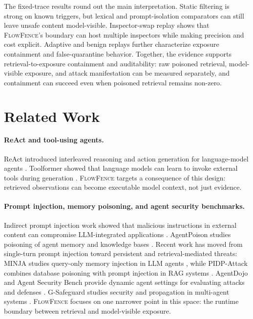 \documentclass[11pt]{article}
\newcommand{\ff}{\textsc{FlowFence}\xspace}
\begin{document}
The fixed-trace results round out the main interpretation. Static filtering is strong on known triggers, but lexical and prompt-isolation comparators can still leave unsafe content model-visible. Inspector-swap replay shows that \ff's boundary can host multiple inspectors while making precision and cost explicit. Adaptive and benign replays further characterize exposure containment and false-quarantine behavior. Together, the evidence supports retrieval-to-exposure containment and auditability: raw poisoned retrieval, model-visible exposure, and attack manifestation can be measured separately, and containment can succeed even when poisoned retrieval remains non-zero.

\section{Related Work}

\paragraph{ReAct and tool-using agents.}
ReAct introduced interleaved reasoning and action generation for language-model agents \citep{react}. Toolformer showed that language models can learn to invoke external tools during generation \citep{toolformer}. \ff targets a consequence of this design: retrieved observations can become executable model context, not just evidence.

\paragraph{Prompt injection, memory poisoning, and agent security benchmarks.}
Indirect prompt injection work showed that malicious instructions in external content can compromise LLM-integrated applications \citep{greshake2023indirect}. AgentPoison studies poisoning of agent memory and knowledge bases \citep{agentpoison}. Recent work has moved from single-turn prompt injection toward persistent and retrieval-mediated threats: MINJA studies query-only memory injection in LLM agents \citep{dong2025minja}, while PIDP-Attack combines database poisoning with prompt injection in RAG systems \citep{wang2026pidp}. AgentDojo and Agent Security Bench provide dynamic agent settings for evaluating attacks and defenses \citep{agentdojo,asb}. G-Safeguard studies security and propagation in multi-agent systems \citep{gsafeguard}. \ff focuses on one narrower point in this space: the runtime boundary between retrieval and model-visible exposure.
\end{document}

